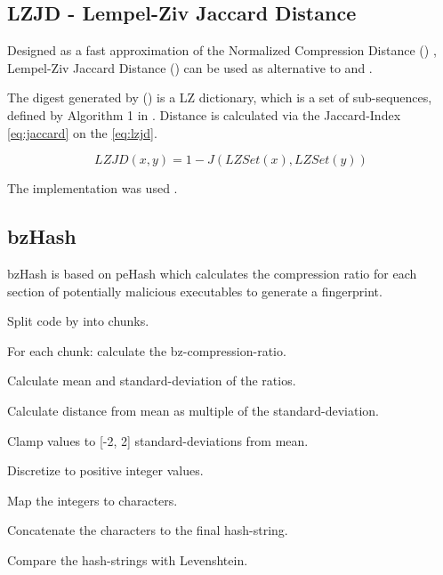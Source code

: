 \documentclass[../main.tex]{subfiles}
\begin{document}
\subsection{LZJD - Lempel-Ziv Jaccard Distance}
Designed as a fast approximation of the Normalized Compression Distance () \cite{raff2017alternative}, Lempel-Ziv Jaccard Distance () can be used as alternative to  and  \cite{raff2018lempel}.

The digest generated by  () is a LZ dictionary, which is a set of sub-sequences, defined by Algorithm 1 in \cite{raff2017alternative}. Distance is calculated via the Jaccard-Index \eqref{eq:jaccard} on the  \eqref{eq:lzjd}.

\begin{equation}
  LZJD(x,y) = 1 - J(LZSet(x), LZSet(y))
  \label{eq:lzjd}
\end{equation}

The  implementation was used \cite{raff2019pylzjd}.


\subsection{bzHash}
bzHash is based on peHash\cite{wicherski2009pehash} which calculates the compression ratio for each section of potentially malicious executables to generate a fingerprint.

\begin{ol}
  \item Split code by  into chunks.
  \item For each chunk: calculate the bz-compression-ratio.
  \item Calculate mean and standard-deviation of the ratios.
  \item Calculate distance from mean as multiple of the standard-deviation.
  \item Clamp values to [-2, 2] standard-deviations from mean.
  \item Discretize to positive integer values.
  \item Map the integers to characters.
  \item Concatenate the characters to the final hash-string.
  \item Compare the hash-strings with Levenshtein.
\end{ol}
\end{document}
